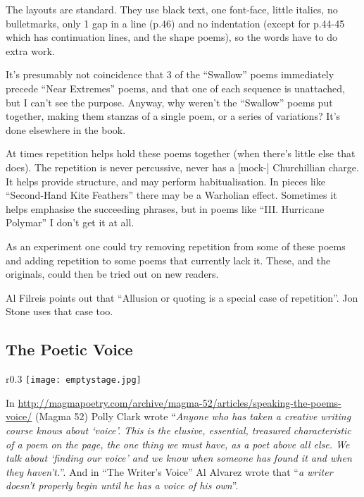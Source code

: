 \documentclass[11pt]{article}
\begin{document}
The layouts are standard. They use black text, one font-face, little italics, no bulletmarks, only 1 gap in a line (p.46) and no indentation (except for p.44-45 which has continuation lines, and the shape poems), so the words have to do extra work.

It's presumably not coincidence that 3 of the ``Swallow'' poems immediately precede ``Near Extremes'' poems, and that one of each sequence is unattached, but I can't see the purpose. Anyway, why weren't the ``Swallow'' poems put together, making them stanzas of a single poem, or a series of variations? It's done elsewhere in the book.

At times repetition helps hold these poems together (when there's little else that does). The repetition is never percussive, never has a [mock-] Churchillian charge. It helps provide structure, and may perform habitualisation. In pieces like ``Second-Hand Kite Feathers'' there may be a Warholian effect. Sometimes it helps emphasise the succeeding phrases, but in poems like ``III. Hurricane Polymar'' I don't get it at all.

As an experiment one could try removing repetition from some of these poems and adding repetition to some poems that currently lack it. These, and the originals, could then be tried out on new readers.

Al Filreis points out that ``Allusion or quoting is a special case of repetition''. Jon Stone uses that case too.


\newpage\subsection{The Poetic Voice}
\begin{wrapfigure}{r}{0.3\textwidth}
\centering
\texttt{[image: emptystage.jpg]}
\end{wrapfigure}
In \url{http://magmapoetry.com/archive/magma-52/articles/speaking-the-poems-voice/} (Magma 52)
Polly Clark wrote ``\textit{Anyone who has taken a creative writing course knows about ‘voice’. This is the elusive, essential, treasured characteristic of a poem on the page, the one thing we must have, as a poet above all else. We talk about ‘finding our voice’ and we know when someone has found it and when they haven’t.}''. And in ``The Writer's Voice'' Al Alvarez wrote that ``\textit{a writer doesn't properly begin until he has a voice of his own}''.
\end{document}
